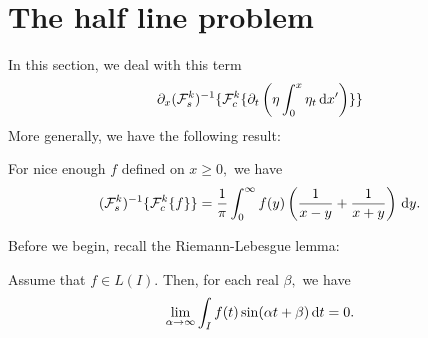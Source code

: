 \documentclass[10pt,reqno,oneside,a4paper, landscape]{article}
\begin{document}
\section{The half line problem}
In this section, we deal with this term 
\[ 
\partial_x(\mathcal{F}^k_s)^{-1} \{ \mathcal{F}^k_c \{ \partial_t \left( \eta \int^{x}_0\eta_{t} \,\mathrm{d} x' \right)\} \}
\]
More generally, we have the following result:
\begin{thm}
For nice enough $f$ defined on $x\geq 0,$ we have
\[ 
(\mathcal{F}^k_s)^{-1} \{ \mathcal{F}^k_c \{ f \} \} = \frac{1}{\pi} \int^{\infty}_0 f(y) \left( \frac{1}{x-y} + \frac{1}{x+y} \right) \,\mathrm{d} y.
\]
\end{thm}
Before we begin, recall the Riemann-Lebesgue lemma:
\begin{lem}
Assume that $f \in L(I).$ Then, for each real $\beta,$ we have 
\[\lim_{\alpha\to\infty} \int_I f(t) \sin(\alpha t + \beta) \,\mathrm{d} t = 0.\]
\end{lem}
\end{document}
